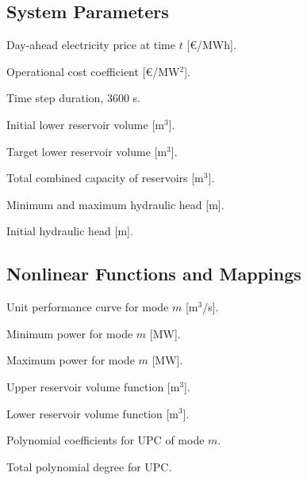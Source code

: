 \documentclass[journal]{IEEEtran}
\begin{document}
\subsection*{System Parameters}
\begin{IEEEdescription}
\item[$\lambda_t^{\text{DA}}$] Day-ahead electricity price at time $t$ [€/MWh].
\item[$C_{\text{op}}$] Operational cost coefficient [€/MW$^2$].
\item[$\Delta t$] Time step duration, 3600 s.
\item[$v_{\text{low}}^{\text{init}}$] Initial lower reservoir volume [m$^3$].
\item[$v_{\text{low}}^{\text{target}}$] Target lower reservoir volume [m$^3$].
\item[$v_{\text{total}}$] Total combined capacity of reservoirs [m$^3$].
\item[$h_\text{min}, h_\text{max}$] Minimum and maximum hydraulic head [m].
\item[$h^{\text{init}}$] Initial hydraulic head [m].
\end{IEEEdescription}

\subsection*{Nonlinear Functions and Mappings}
\begin{IEEEdescription}
\item[$f_m^{\text{UPC}}(p, h)$] Unit performance curve for mode $m$ [m$^3$/s].
\item[$p_{\min}^m(h)$] Minimum power for mode $m$ [MW].
\item[$p_{\max}^m(h)$] Maximum power for mode $m$ [MW].
\item[$f_{\text{up}}^{\text{vol}}(h)$] Upper reservoir volume function [m$^3$].
\item[$f_{\text{low}}^{\text{vol}}(h)$] Lower reservoir volume function [m$^3$].
\item[$c_{ab}^{(m)}$] Polynomial coefficients for UPC of mode $m$.
\item[$d$] Total polynomial degree for UPC.
\end{IEEEdescription}
\end{document}
